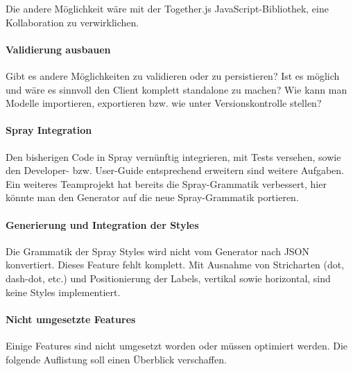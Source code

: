 Die andere Möglichkeit wäre mit der Together.js JavaScript-Bibliothek,
eine Kollaboration zu verwirklichen.

\paragraph{Validierung ausbauen}

Gibt es andere Möglichkeiten zu validieren oder zu persistieren?
Ist es möglich und wäre es sinnvoll den Client komplett standalone
zu machen?
Wie kann man Modelle importieren, exportieren bzw. wie unter
Versionskontrolle stellen?

\paragraph{Spray Integration}

Den bisherigen Code in Spray vernünftig integrieren, mit Tests versehen, sowie
den Developer- bzw. User-Guide entsprechend erweitern sind weitere Aufgaben.
Ein weiteres Teamprojekt hat bereits die Spray-Grammatik verbessert,
hier könnte man den Generator auf die neue Spray-Grammatik portieren.

\paragraph{Generierung und Integration der Styles}

Die Grammatik der Spray Styles wird nicht vom Generator nach JSON konvertiert. Dieses 
Feature fehlt komplett. Mit Ausnahme von Stricharten (dot, dash-dot, etc.) und Positionierung
der Labels, vertikal sowie horizontal, sind keine Styles implementiert.

\paragraph{Nicht umgesetzte Features}

Einige Features sind nicht umgesetzt worden oder müssen optimiert werden. Die folgende Auflistung soll einen
Überblick verschaffen.


